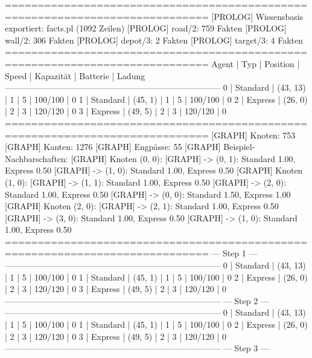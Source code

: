 =============================================================================
[PROLOG]   Wissensbasis exportiert: facts.pl (1092 Zeilen)
[PROLOG]   road/2:   759 Fakten
[PROLOG]   wall/2:   306 Fakten
[PROLOG]   depot/3:  2 Fakten
[PROLOG]   target/3: 4 Fakten
=============================================================================
 Agent | Typ       | Position    | Speed   | Kapazität  | Batterie  | Ladung
-----------------------------------------------------------------------------
 0     | Standard  | (43, 13)    | 1       | 5          | 100/100   | 0
 1     | Standard  | (45, 1)     | 1       | 5          | 100/100   | 0
 2     | Express   | (26, 0)     | 2       | 3          | 120/120   | 0
 3     | Express   | (49, 5)     | 2       | 3          | 120/120   | 0
=============================================================================
[GRAPH]    Knoten:              753
[GRAPH]    Kanten:              1276
[GRAPH]    Engpässe:            55
[GRAPH]    Beispiel-Nachbarschaften:
[GRAPH]      Knoten (0, 0):
[GRAPH]        -> (0, 1): Standard 1.00, Express 0.50
[GRAPH]        -> (1, 0): Standard 1.00, Express 0.50
[GRAPH]      Knoten (1, 0):
[GRAPH]        -> (1, 1): Standard 1.00, Express 0.50
[GRAPH]        -> (2, 0): Standard 1.00, Express 0.50
[GRAPH]        -> (0, 0): Standard 1.50, Express 1.00
[GRAPH]      Knoten (2, 0):
[GRAPH]        -> (2, 1): Standard 1.00, Express 0.50
[GRAPH]        -> (3, 0): Standard 1.00, Express 0.50
[GRAPH]        -> (1, 0): Standard 1.00, Express 0.50
=============================================================================
                                --- Step 1 ---
-----------------------------------------------------------------------------
 0     | Standard  | (43, 13)    | 1       | 5          | 100/100   | 0
 1     | Standard  | (45, 1)     | 1       | 5          | 100/100   | 0
 2     | Express   | (26, 0)     | 2       | 3          | 120/120   | 0
 3     | Express   | (49, 5)     | 2       | 3          | 120/120   | 0
-----------------------------------------------------------------------------
                                --- Step 2 ---
-----------------------------------------------------------------------------
 0     | Standard  | (43, 13)    | 1       | 5          | 100/100   | 0
 1     | Standard  | (45, 1)     | 1       | 5          | 100/100   | 0
 2     | Express   | (26, 0)     | 2       | 3          | 120/120   | 0
 3     | Express   | (49, 5)     | 2       | 3          | 120/120   | 0
-----------------------------------------------------------------------------
                                --- Step 3 ---
